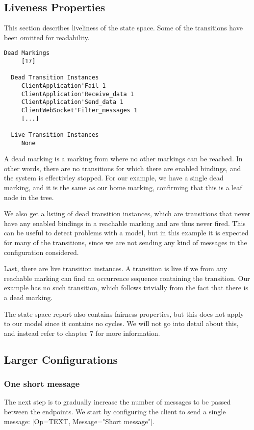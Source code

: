 	\subsection{Liveness Properties}
	This section describes liveliness of the state space. Some of the transitions
	have been omitted for readability.
	
	\begin{lstlisting}[language={}]
  Dead Markings
     [17]

  Dead Transition Instances
     ClientApplication'Fail 1
     ClientApplication'Receive_data 1
     ClientApplication'Send_data 1
     ClientWebSocket'Filter_messages 1
     [...]

  Live Transition Instances
     None
	\end{lstlisting}
	
	A dead marking is a marking from where no other markings can be reached.
	 In other words, there are no transitions
	for which there are enabled bindings, and the system is effectivley stopped.
	For our example, we have a single dead marking, and it is the same as our home
	marking, confirming that this is a leaf node in the tree.
	
	We also get a listing of dead transition instances, which are transitions that
	never have any enabled bindings in a reachable marking and are thus never
	fired. This can be useful to detect problems with a model, but in this example
	it is expected for many of the transitions, since we are not sending any kind
	of messages in the configuration considered.
	
	Last, there are live transition instances. A transition is live if we from any
	reachable marking can find an occurrence sequence containing the transition.
	Our example has no such transition, which follows trivially from the fact that
	there is a dead marking.

	The state space report also contains fairness properties, but this does
	not apply to our model since it contains no cycles. We will not go into detail
	about this, and instead refer to \cite{cpn_book} chapter 7 for more
	information.
	
\subsection{Larger Configurations} 

	\subsubsection{One short message}
	The next step is to gradually increase the number of messages to be passed
	between the endpoints. We start by configuring the client to send a single
	message: |{Op=TEXT, Message="Short message"}|. 
	
